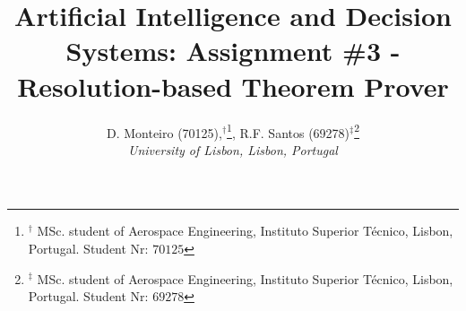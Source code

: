 \documentclass[11pt,journal,compsoc]{IEEEtran}
\begin{document}
%
\title{Artificial Intelligence and Decision Systems: Assignment \#3 - Resolution-based Theorem Prover}


\author{D. Monteiro (70125),$^\dagger$\thanks{$^\dagger$ MSc. student of Aerospace Engineering, Instituto Superior Técnico, Lisbon, Portugal. Student Nr: $70125$}, R.F. Santos (69278)$^\ddagger$\thanks{$^\ddagger$ MSc. student of Aerospace Engineering, Instituto Superior Técnico, Lisbon, Portugal. Student Nr: $69278$}\\[.2 cm]
\textit{University of Lisbon, Lisbon, Portugal}}%
     
        


% 
%
\end{document}
